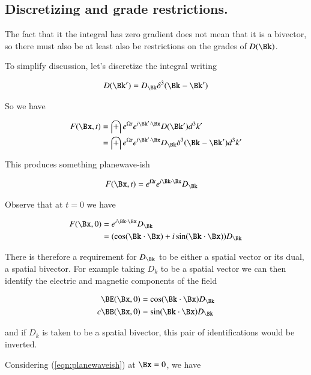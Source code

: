 \subsection{Discretizing and grade restrictions.}

The fact that it the integral has zero gradient does not mean that it is a bivector, so there must also be at least also be restrictions on the grades of $D(\Bk)$.

To simplify discussion, let's discretize the integral writing

\begin{align*}
D(\Bk') = D_\Bk \delta^3 (\Bk - \Bk')
\end{align*}

So we have

\begin{align*}
F(\Bx,t) 
&= \int e^{\Omega t} e^{i \Bk' \cdot \Bx} D(\Bk') d^3 k' \\
&= \int e^{\Omega t} e^{i \Bk' \cdot \Bx} D_\Bk \delta^3(\Bk - \Bk') d^3 k' \\
\end{align*}

This produces something planewave-ish

\begin{align}\label{eqn:planewaveish}
F(\Bx,t) &= e^{\Omega t} e^{i \Bk \cdot \Bx} D_\Bk 
\end{align}

Observe that at $t=0$ we have

\begin{align*}
F(\Bx,0) 
&= e^{i \Bk \cdot \Bx} D_\Bk  \\
&= (\cos (\Bk \cdot \Bx) + i \sin(\Bk \cdot \Bx)) D_\Bk  \\
\end{align*}

There is therefore a requirement for $D_\Bk$ to be either a spatial vector or its dual, a spatial bivector.  For example taking $D_k$ to be a spatial vector we can then identify the electric and magnetic components of the field

\begin{align*}
\BE(\Bx,0) &= \cos (\Bk \cdot \Bx) D_\Bk \\
c \BB(\Bx,0) &= \sin (\Bk \cdot \Bx) D_\Bk
\end{align*}

and if $D_k$ is taken to be a spatial bivector, this pair of identifications would be inverted.

Considering (\ref{eqn:planewaveish}) at $\Bx=0$, we have

